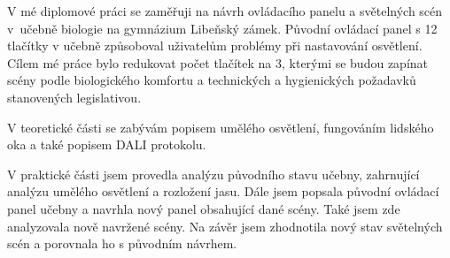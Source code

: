 \medskip
V mé diplomové práci se zaměřuji na návrh ovládacího panelu a světelných scén v~učebně biologie na
gymnázium Libeňský zámek. Původní ovládací panel s 12 tlačítky v učebně způsoboval uživatelům problémy při
nastavování osvětlení. Cílem mé práce bylo redukovat počet tlačítek na 3, kterými se budou zapínat scény
podle biologického komfortu a technických a hygienických požadavků stanovených legislativou.

\medskip
V teoretické části se zabývám popisem umělého osvětlení, fungováním lidského oka a také popisem DALI protokolu.

\medskip
V praktické části jsem provedla analýzu původního stavu učebny, zahrnující analýzu umělého osvětlení a
rozložení jasu. Dále jsem popsala původní ovládací panel učebny a navrhla nový panel obsahující dané scény.
Také jsem zde analyzovala nově navržené scény. Na závěr jsem zhodnotila nový stav světelných scén a porovnala ho s původním návrhem.





